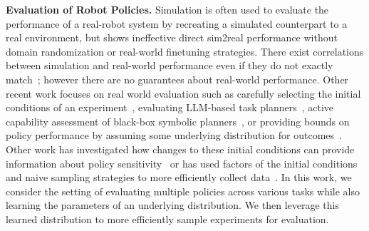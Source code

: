 \textbf{Evaluation of Robot Policies.}
Simulation is often used to evaluate the performance of a real-robot system \cite{deitke2020robothor, anderson2021sim, kadian2020sim2real, gervet2023navigating} by recreating a simulated counterpart to a real environment, but shows ineffective direct sim2real performance without domain randomization or real-world finetuning strategies.
There exist correlations between simulation and real-world performance even if they do not exactly match~\cite{wilbert_colloseum, simpler_env}; however there are no guarantees about real-world performance.
Other recent work focuses on real world evaluation such as carefully selecting the initial conditions of an experiment~\cite{kress2024robot}, evaluating LLM-based task planners~\cite{hu2024deploying}, active capability assessment of black-box symbolic planners~\cite{verma2021discovering, verma2023autonomous, nayyar2022differential}, or providing bounds on policy performance by assuming some underlying distribution for outcomes~\cite{that_tri_paper}.
Other work has investigated how changes to these initial conditions can provide information about policy sensitivity~\cite{parekh2024investigating,xie2024decomposing,anwar2024contrast} or has used factors of the initial conditions and naive sampling strategies to more efficiently collect data~\cite{gao2024}.
In this work, we consider the setting of evaluating multiple policies across various tasks while also learning the parameters of an underlying distribution. 
We then leverage this learned distribution to more efficiently sample experiments for evaluation.
